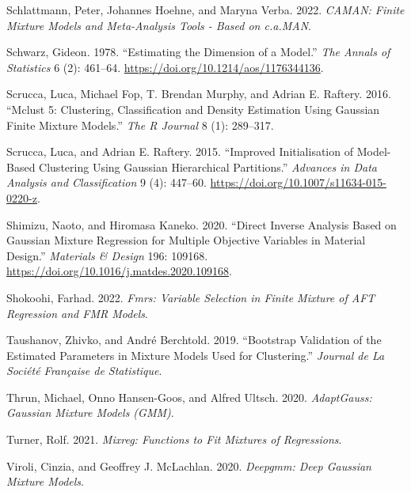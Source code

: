 \begin{CSLReferences}{1}{0}
\leavevmode{}%
Schlattmann, Peter, Johannes Hoehne, and Maryna Verba. 2022. \emph{CAMAN: Finite Mixture Models and Meta-Analysis Tools - Based on c.a.MAN}.

\leavevmode{}%
Schwarz, Gideon. 1978. {``Estimating the {Dimension} of a {Model}.''} \emph{The Annals of Statistics} 6 (2): 461--64. \url{https://doi.org/10.1214/aos/1176344136}.

\leavevmode{}%
Scrucca, Luca, Michael Fop, T. Brendan Murphy, and Adrian E. Raftery. 2016. {``Mclust 5: {Clustering}, {Classification} and {Density Estimation Using Gaussian Finite Mixture Models}.''} \emph{The R Journal} 8 (1): 289--317.

\leavevmode{}%
Scrucca, Luca, and Adrian E. Raftery. 2015. {``Improved Initialisation of Model-Based Clustering Using {Gaussian} Hierarchical Partitions.''} \emph{Advances in Data Analysis and Classification} 9 (4): 447--60. \url{https://doi.org/10.1007/s11634-015-0220-z}.

\leavevmode{}%
Shimizu, Naoto, and Hiromasa Kaneko. 2020. {``Direct Inverse Analysis Based on {Gaussian} Mixture Regression for Multiple Objective Variables in Material Design.''} \emph{Materials \& Design} 196: 109168. \url{https://doi.org/10.1016/j.matdes.2020.109168}.

\leavevmode{}%
Shokoohi, Farhad. 2022. \emph{Fmrs: Variable Selection in Finite Mixture of AFT Regression and FMR Models}.

\leavevmode{}%
Taushanov, Zhivko, and André Berchtold. 2019. {``Bootstrap Validation of the Estimated Parameters in Mixture Models Used for Clustering.''} \emph{Journal de La Société Française de Statistique}.

\leavevmode{}%
Thrun, Michael, Onno Hansen-Goos, and Alfred Ultsch. 2020. \emph{AdaptGauss: Gaussian Mixture Models (GMM)}.

\leavevmode{}%
Turner, Rolf. 2021. \emph{Mixreg: Functions to Fit Mixtures of Regressions}.

\leavevmode{}%
Viroli, Cinzia, and Geoffrey J. McLachlan. 2020. \emph{Deepgmm: Deep Gaussian Mixture Models}.


\end{CSLReferences}
